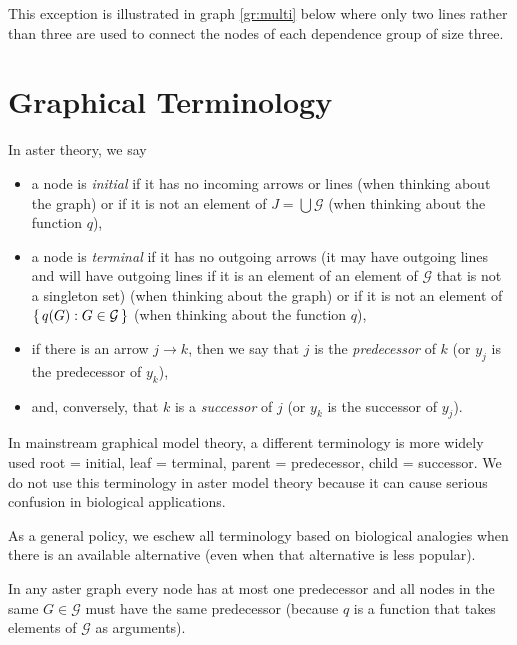 This exception is illustrated in graph \eqref{gr:multi} below
where only two lines
rather than three are used to connect the nodes of each
dependence group of size three.

\section{Graphical Terminology}
\label{sec:graphical-terminology}

In aster theory, we say
\begin{itemize}
\item a node is \emph{initial} if it has no incoming arrows
    or lines (when thinking about the graph) or if it is not an element
    of $J = \bigcup \mathcal{G}$ (when thinking about the function $q$),
\item a node is \emph{terminal} if it has no outgoing arrows
    (it may have outgoing lines and will have outgoing lines if it is
    an element of an element of $\mathcal{G}$ that is not a singleton set)
    (when thinking about the graph) or if it is not an element
    of $\{\,  q(G) : G \in \mathcal{G}  \,\}$
    (when thinking about the function $q$),
\item if there is an arrow $j \longrightarrow k$, then we say that $j$
    is the \emph{predecessor} of $k$ (or $y_j$ is the predecessor of $y_k$),
\item and, conversely, that $k$ is a \emph{successor} of $j$
    (or $y_k$ is the successor of $y_j$).
\end{itemize}

In mainstream graphical model theory, a different terminology is more widely
used \citep{lauritzen} root = initial, leaf = terminal, parent = predecessor,
child = successor.  We do not use this terminology in aster model theory
because it can cause serious confusion in biological applications.

As a general policy, we eschew all terminology based on biological analogies
when there is an available alternative (even when that alternative is less
popular).

In any aster graph every node has at most one predecessor and all nodes in
the same $G \in \mathcal{G}$ must have the same predecessor (because $q$
is a function that takes elements of $\mathcal{G}$ as arguments).

